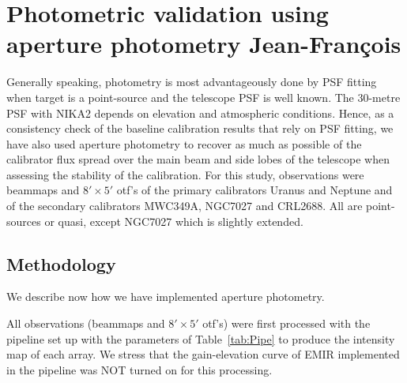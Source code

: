 
%


\section{Photometric validation using aperture photometry {\color{blue} Jean-Fran\c cois}}
\label{ap:aperture_photometry}

Generally speaking, photometry is most advantageously done by PSF fitting when target is a point-source
and the telescope PSF is well known. The 30-metre PSF with NIKA2 depends on elevation and atmospheric conditions.
Hence, as a consistency check of the baseline calibration results that rely on PSF fitting, we have also used aperture photometry to recover as much as possible of the calibrator flux spread over the main beam and side
lobes of the telescope when assessing the stability of the calibration. 
For this study, observations were beammaps and $8' \times 5'$ otf's of the primary calibrators Uranus and Neptune
and of the secondary calibrators MWC349A, NGC7027 and CRL2688. All are
point-sources or quasi, except NGC7027 which is slightly extended.


\subsection{Methodology}
\label{ap:aperture_photometry_method}
We describe now how we have implemented aperture photometry.

All observations (beammaps and $8' \times 5'$ otf's) were first processed 
with the pipeline set up with the parameters of Table~\ref{tab:Pipe} to produce the intensity map of each array.
We stress that the  gain-elevation curve of EMIR implemented in the pipeline was NOT  turned on for this processing.

